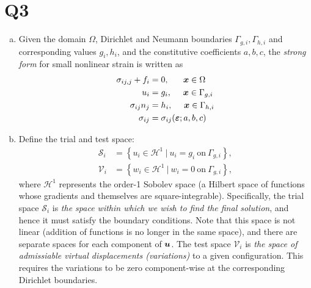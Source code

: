 \section*{Q3}
\begin{enumerate}[(a)]
\item { %
Given the domain $\Omega$, Dirichlet and Neumann boundaries $\Gamma_{g,i}, \Gamma_{h,i}$ and corresponding values $g_i, h_i$, and the constitutive coefficients $a, b, c$, the \emph{strong form} for small nonlinear strain is written as 
\begin{subequations}
\begin{align}
    \sigma_{ij,j} + f_i &= 0, ~~~~~ \bm{x} \in \Omega \\
    u_i &= g_i, ~~~~ \bm{x} \in \Gamma_{g,i} \\
    \sigma_{ij} n_j &= h_i, ~~~~ \bm{x} \in \Gamma_{h,i} \\
    \sigma_{ij} &= \sigma_{ij}(\bm{\varepsilon}; a, b, c)
\end{align}
\end{subequations}
} 
\item { %
Define the trial and test space:
\begin{equation}
\begin{aligned}
    \mathcal{S}_i &= \left \{ u_i \in \mathcal{H}^1 ~|~ u_i = g_i ~\textrm{on}~ \Gamma_{g,i} \right \}, \\
    \mathcal{V}_i &= \left \{ w_i \in \mathcal{H}^1 ~|~ w_i = 0 ~\textrm{on}~ \Gamma_{g,i} \right \},
\end{aligned}
\end{equation}
where $\mathcal{H}^1$ represents the order-1 Sobolev space (a Hilbert space of functions whose gradients and themselves are square-integrable).
Specifically, the trial space $\mathcal{S}_i$ is \emph{the space within which we wish to find the final solution}, and hence it must satisfy the boundary conditions. Note that this space is not linear (addition of functions is no longer in the same space), and there are separate spaces for each component of $\bm{u}$. 
The test space $\mathcal{V}_i$ is \emph{the space of admissiable virtual displacements (variations)} to a given configuration. 
This requires the variations to be zero component-wise at the corresponding Dirichlet boundaries. 

}
\end{enumerate}
